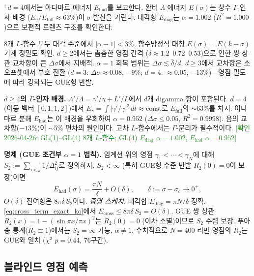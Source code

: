 \documentclass[11pt, a4paper]{article}
\theoremstyle{definition}
\theoremstyle{plain}
\begin{document}
\begin{enumerate}
\noindent
${}^\dagger$\,$d=4$에서는 아다마르 에너지 $E_{\mathrm{had}}$를 보고한다.
완비 $\Lambda$ 에너지 $E(\sigma)$는 상수 $\Gamma$-인자 배경
($E_\gamma/E_{\mathrm{full}}\approx 63\%$)이 $\sigma$-발산을 가린다.
대각항 $E_{\mathrm{diag}}$는 $\alpha=1.002$ ($R^2=1.000$)으로
보편적 로렌츠 구조를 확인한다.

\smallskip\noindent
8개 $L$-함수 모두 대각 수준에서 $|\alpha-1|<3\%$, 함수방정식 대칭
$E(\sigma)=E(k{-}\sigma)$ 기계 정밀도 확인.
$d\geq 2$에서는 촘촘한 영점 간격
($\bar\delta\approx 1.2$~$0.72$~$0.53$)으로 인한 쌍 상관 교차항이
큰 $\Delta\sigma$에서 지배적.
$\alpha=1$ 회복 범위는 $\Delta\sigma\lesssim\bar\delta/d$.
$d\geq 3$에서 교차항은 소 오프셋에서 부호 전환
($d=3$: $\Delta\sigma\approx 0.08$, $-9\%$;
$d=4$: $\approx 0.05$, $-13\%$)---영점 밀도에 따라 강화되는 GUE형 반발.

\smallskip\noindent
\textbf{$d\geq 4$의 $\Gamma$-인자 배경.}\;
$\Lambda'/\Lambda = \gamma'/\gamma + L'/L$에서 $d$개 digamma 항이 포함된다.
$d=4$ (이동 벡터 $[0,1,1,2]$)에서
$E_\gamma=\int|\gamma'/\gamma|^2\,dt \approx \text{const}$로
$E_{\mathrm{full}}$의 $\sim$63\%를 차지.
아다마르 분해 $E_{\mathrm{had}}$는 이 배경을 우회하여
$\alpha=0.952$ ($\Delta\sigma\leq 0.05$, $R^2=0.9998$).
음의 교차항($-13\%$)이 $\sim$5\% 편차의 원인이다.
고차 $L$-함수에서는 $\Gamma$-분리가 필수적이다.
\textcolor{ForestGreen}{[확인 2026-04-26; GL(1)--GL(4) 8개 $L$-함수;
GL(4) $E_{\mathrm{diag}}$ $\alpha=1.002$, $E_{\mathrm{had}}$ $\alpha=0.952$]}

\smallskip\noindent
\textbf{명제 (GUE 조건부 $\alpha=1$ 법칙).}\;
임계선 위의 영점 $\gamma_1<\cdots<\gamma_N$에 대해
$S_2:=\sum_{i<j}1/\Delta_{ij}^{2}$로 정의하자.
$S_2<\infty$ (특히 GUE형 수준 반발 $R_2(0)=0$이 보장)이면
\[
  E_{\mathrm{had}}(\sigma)
    = \frac{\pi N}{\delta} + O(\delta),
  \qquad \delta:=\sigma-\sigma_c\to 0^{+},
\]
$O(\delta)$ 잔여항은 $8\pi\delta\,S_2$이다.
\emph{증명 스케치.}\;
대각합 $E_{\mathrm{diag}}=\pi N/\delta$ 정확.
\eqref{eq:cross_term_exact_ko}에서
$E_{\mathrm{cross}}\leq 8\pi\delta\,S_2=O(\delta)$.
GUE 쌍 상관 $R_2(x)=1-(\sin\pi x/\pi x)^{2}$는 $R_2(0)=0$
(이차 소멸)이므로 $S_2$ 수렴 보장.
푸아송 통계($R_2\equiv 1$)에서는 $S_2=\infty$ 가능, $\alpha\neq 1$.
수치적으로 $N=400$ 리만 영점의 $R_2$는 GUE와 일치
($\chi^{2}$ $p=0.44$, 76구간).
\end{enumerate}

\subsection{블라인드 영점 예측}
\label{app:dirichlet:blind}
\end{document}
